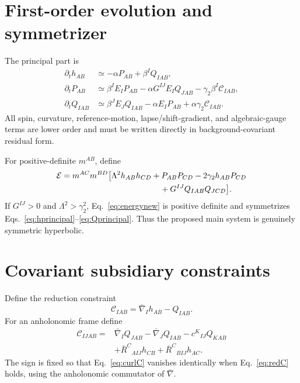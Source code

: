\documentclass[11pt]{article}
\newcommand{\bn}{\bar\nabla}
\newcommand{\bR}{\bar R}
\newcommand{\cC}{\mathcal C}
\newcommand{\cE}{\mathcal E}
\begin{document}
\section{First-order evolution and symmetrizer}
The principal part is
\begin{align}
\partial_t h_{AB}&\simeq-\alpha P_{AB}+\beta^I Q_{IAB},
\label{eq:hprincipal}\\
\partial_tP_{AB}&\simeq\beta^IE_IP_{AB}-\alpha G^{IJ}E_IQ_{JAB}
-\gamma_2\beta^I\cC_{IAB},
\label{eq:Pprincipal}\\
\partial_tQ_{IAB}&\simeq\beta^JE_JQ_{IAB}-\alpha E_IP_{AB}
+\alpha\gamma_2\cC_{IAB}.
\label{eq:Qprincipal}
\end{align}
All spin, curvature, reference-motion, lapse/shift-gradient, and algebraic-gauge terms are lower order and must be written directly in background-covariant residual form.

For positive-definite $m^{AB}$, define
\begin{equation}
\begin{split}
\cE={}&m^{AC}m^{BD}\bigl[\Lambda^2h_{AB}h_{CD}+P_{AB}P_{CD}
-2\gamma_2h_{AB}P_{CD}\\
&\hspace{38mm}+G^{IJ}Q_{IAB}Q_{JCD}\bigr].
\end{split}
\label{eq:energynew}
\end{equation}
If $G^{IJ}>0$ and $\Lambda^2>\gamma_2^2$, Eq.~\eqref{eq:energynew} is positive definite and symmetrizes Eqs.~\eqref{eq:hprincipal}--\eqref{eq:Qprincipal}. Thus the proposed main system is genuinely symmetric hyperbolic.

\section{Covariant subsidiary constraints}
Define the reduction constraint
\begin{equation}
\boxed{\cC_{IAB}=\bn_Ih_{AB}-Q_{IAB}.}
\label{eq:redC}
\end{equation}
For an anholonomic frame define
\begin{equation}
\boxed{\begin{split}
\cC_{IJAB}={}&\bn_IQ_{JAB}-\bn_JQ_{IAB}-c^K{}_{IJ}Q_{KAB}\\
&+\bR^C{}_{A IJ}h_{CB}+\bR^C{}_{B IJ}h_{AC}.
\end{split}}
\label{eq:curlC}
\end{equation}
The sign is fixed so that Eq.~\eqref{eq:curlC} vanishes identically when Eq.~\eqref{eq:redC} holds, using the anholonomic commutator of $\bn$.
\end{document}
